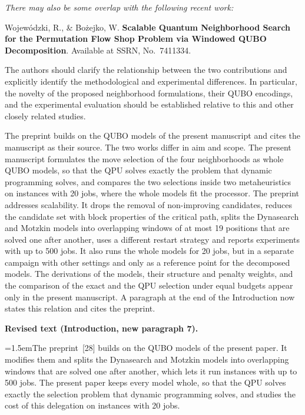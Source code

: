\documentclass[12pt]{article}
\newenvironment{rc}[1]{\par\medskip\noindent\itshape\renewcommand{\emph}[1]{\textbf{##1}}\ignorespaces}{\par}
\newcommand{\answer}[1]{\par\smallskip\noindent #1\par}
\newcommand{\change}[3]{\par\smallskip\noindent\textbf{Revised text (#1).}\par
  {\leftskip=1.5em\noindent#3\par}}
\begin{document}
\begin{rc}{R2.G3 --- Relation to SSRN 7411334}
There may also be some overlap with the following recent work:

Wojewódzki, R., \& Bożejko, W. \emph{Scalable Quantum Neighborhood Search for the Permutation Flow Shop Problem via Windowed QUBO Decomposition}. Available at SSRN, No.~7411334.

The authors should clarify the relationship between the two contributions and explicitly identify the methodological and experimental differences. In particular, the novelty of the proposed neighborhood formulations, their QUBO encodings, and the experimental evaluation should be established relative to this and other closely related studies.
\end{rc}
\answer{The preprint builds on the QUBO models of the present manuscript and cites the manuscript as their source. The two works differ in aim and scope. The present manuscript formulates the move selection of the four neighborhoods as whole QUBO models, so that the QPU solves exactly the problem that dynamic programming solves, and compares the two selections inside two metaheuristics on instances with 20 jobs, where the whole models fit the processor. The preprint addresses scalability. It drops the removal of non-improving candidates, reduces the candidate set with block properties of the critical path, splits the Dynasearch and Motzkin models into overlapping windows of at most 19 positions that are solved one after another, uses a different restart strategy and reports experiments with up to 500 jobs. It also runs the whole models for 20 jobs, but in a separate campaign with other settings and only as a reference point for the decomposed models. The derivations of the models, their structure and penalty weights, and the comparison of the exact and the QPU selection under equal budgets appear only in the present manuscript. A paragraph at the end of the Introduction now states this relation and cites the preprint.}
\change{Introduction, new paragraph 7}{\textit{(no counterpart in the original manuscript)}}{The preprint~[28] builds on the QUBO models of the present paper. It modifies them and splits the Dynasearch and Motzkin models into overlapping windows that are solved one after another, which lets it run instances with up to 500 jobs. The present paper keeps every model whole, so that the QPU solves exactly the selection problem that dynamic programming solves, and studies the cost of this delegation on instances with 20 jobs.}
\end{document}
